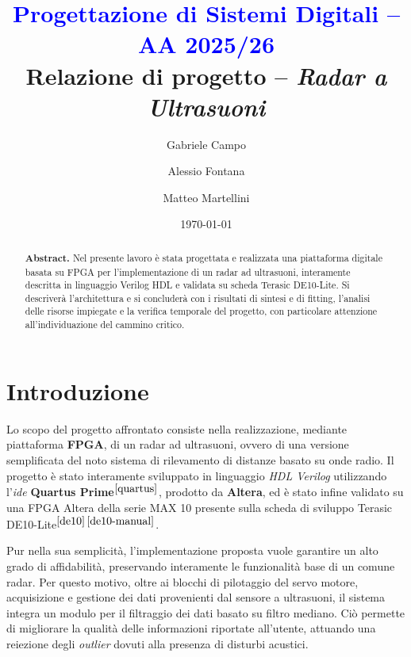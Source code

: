 \documentclass[reprint,amsmath,amssymb,aps,rmp,twoside]{revtex4-2}
\begin{document}
\nocite{achemso-ctrl}%
\title{\textcolor{blue}{Progettazione di Sistemi Digitali -- AA 2025/26}\\ 
Relazione di progetto -- \textit{Radar a Ultrasuoni}}
\author{Gabriele Campo}
\author{Alessio Fontana}
\author{Matteo Martellini}
\date{\today}

\begin{abstract}
{\bf Abstract.} Nel presente lavoro è stata progettata e realizzata una piattaforma digitale basata su FPGA per l’implementazione di un radar ad ultrasuoni, interamente descritta in linguaggio Verilog HDL e validata su scheda Terasic DE10-Lite. Si descriverà l'architettura e si concluderà con i risultati di sintesi e di fitting, l’analisi delle risorse impiegate e la verifica temporale del progetto, con particolare attenzione all'individuazione del cammino critico.
\vspace{0.5 cm}
\end{abstract}


\maketitle

\pagestyle{myheadings}
\twocolumngrid
\tableofcontents
\twocolumngrid
{}

\section{Introduzione}

Lo scopo del progetto affrontato consiste nella realizzazione, mediante piattaforma \textbf{FPGA}, di un radar ad ultrasuoni, ovvero di una versione semplificata del noto sistema di rilevamento di distanze basato su onde radio. Il progetto è stato interamente sviluppato in linguaggio \textit{HDL Verilog} utilizzando l'\textit{ide} \textbf{Quartus Prime}$^{\cite{quartus}}$, prodotto da \textbf{Altera}, ed è stato infine validato su una FPGA Altera della serie MAX 10 presente sulla scheda di sviluppo Terasic DE10-Lite$^{\cite{de10}}$$^{\cite{de10-manual}}$.

Pur nella sua semplicità, l'implementazione proposta vuole garantire un alto grado di affidabilità, preservando interamente le funzionalità base di un comune radar. Per questo motivo, oltre ai blocchi di pilotaggio del servo motore, acquisizione e gestione dei dati provenienti dal sensore a ultrasuoni, il sistema integra un modulo per il filtraggio dei dati basato su filtro mediano. Ciò permette di migliorare la qualità delle informazioni riportate all'utente, attuando una reiezione degli \textit{outlier} dovuti alla presenza di disturbi acustici.
\end{document}
